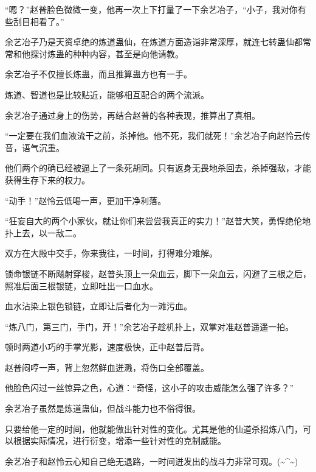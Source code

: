 \begin{this_body}
“嗯？”赵普脸色微微一变，他再一次上下打量了一下余艺冶子，“小子，我对你有些刮目相看了。”

余艺冶子乃是天资卓绝的炼道蛊仙，在炼道方面造诣非常深厚，就连七转蛊仙都常常和他探讨炼蛊的种种内容，甚至是向他请教。

余艺冶子不仅擅长炼蛊，而且推算蛊方也有一手。

炼道、智道也是比较贴近，能够相互配合的两个流派。

余艺冶子通过身上的伤势，再结合赵普的各种表现，推算出了真相。

“一定要在我们血液流干之前，杀掉他。他不死，我们就死！”余艺冶子向赵怜云传音，语气沉重。

他们两个的确已经被逼上了一条死胡同。只有返身无畏地杀回去，杀掉强敌，才能获得生存下来的权力。

“动手！”赵怜云低喝一声，更加干净利落。

“狂妄自大的两个小家伙，就让你们来尝尝我真正的实力！”赵普大笑，勇悍绝伦地扑上去，以一敌二。

双方在大殿中交手，你来我往，一时间，打得难分难解。

锁命银链不断飚射穿梭，赵普头顶上一朵血云，脚下一朵血云，闪避了三根之后，照准后面三根银链，立即吐出一口血水。

血水沾染上银色锁链，立即让后者化为一滩污血。

“炼八门，第三门，手门，开！”余艺冶子趁机扑上，双掌对准赵普遥遥一拍。

顿时两道小巧的手掌光影，速度极快，正中赵普后背。

赵普闷哼一声，背上忽然鲜血迸溅，将伤口全部覆盖。

他脸色闪过一丝惊异之色，心道：“奇怪，这小子的攻击威能怎么强了许多？”

余艺冶子虽然是炼道蛊仙，但战斗能力也不俗得很。

只要给他一定的时间，他就能做出针对性的变化。尤其是他的仙道杀招炼八门，可以根据实际情况，进行衍变，增添一些针对性的克制威能。

余艺冶子和赵怜云心知自己绝无退路，一时间迸发出的战斗力非常可观。(\~{}\^{}\~{})

\end{this_body}


